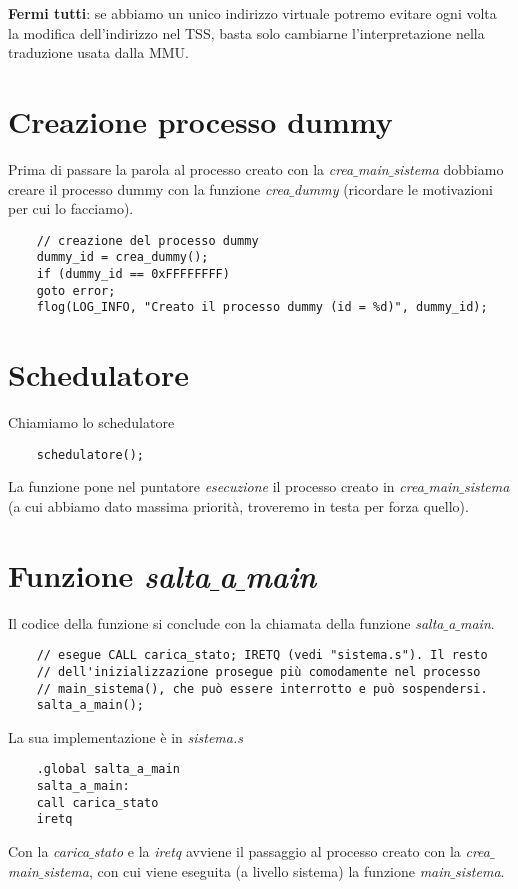 \begin{itemize}
	\textbf{Fermi tutti}: se abbiamo un unico indirizzo virtuale potremo evitare ogni volta la modifica dell'indirizzo nel TSS, basta solo cambiarne l'interpretazione nella traduzione usata dalla MMU.
	
\end{itemize}

\section{Creazione processo dummy}
Prima di passare la parola al processo creato con la \emph {crea$\_$main$\_$sistema} dobbiamo creare il processo dummy con la funzione \emph{crea$\_$dummy} (ricordare le motivazioni per cui lo facciamo).
\small 
\begin{verbatim}
	// creazione del processo dummy
	dummy_id = crea_dummy();
	if (dummy_id == 0xFFFFFFFF)
	goto error;
	flog(LOG_INFO, "Creato il processo dummy (id = %d)", dummy_id);
\end{verbatim}
\normalsize 
\section{Schedulatore}
Chiamiamo lo schedulatore
\begin{verbatim}
	schedulatore();
\end{verbatim}
La funzione pone nel puntatore \emph{esecuzione} il processo creato in \emph{crea$\_$main$\_$sistema} (a cui abbiamo dato massima priorità, troveremo in testa per forza quello).


\section{Funzione \emph{salta$\_$a$\_$main}}
Il codice della funzione si conclude con la chiamata della funzione \emph{salta$\_$a$\_$main}.
\small 
\begin{verbatim}
	// esegue CALL carica_stato; IRETQ (vedi "sistema.s"). Il resto
	// dell'inizializzazione prosegue più comodamente nel processo
	// main_sistema(), che può essere interrotto e può sospendersi.
	salta_a_main();
\end{verbatim}
\normalsize
La sua implementazione è in \emph{sistema.s}
\small
\begin{verbatim}
	.global salta_a_main
	salta_a_main:
	call carica_stato
	iretq
\end{verbatim}
\normalsize
Con la \emph{carica$\_$stato} e la \emph{iretq} avviene il passaggio al processo creato con la \emph{crea$\_$main$\_$sistema}, con cui viene eseguita (a livello sistema) la funzione \emph{main$\_$sistema}.

